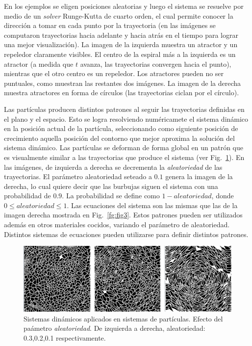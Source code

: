 \documentclass[oneside,a4paper,spanish,links]{amca}
\begin{document}
En los ejemplos se eligen posiciones aleatorias y luego el sistema se resuelve por medio de un {\em solver} Runge-Kutta de cuarto orden, el cual permite conocer la direcci\'on a tomar en cada punto por la trayectoria (en las im\'agenes se computaron trayectorias hacia adelante y hacia atrás en el tiempo para lograr una mejor visualizaci\'on). La imagen de la izquierda muestra un atractor y un repeledor claramente visibles. El centro de la espiral m\'as a la izquierda es un atractor (a medida que $t$ avanza, las trayectorias convergen hacia el punto), mientras que el otro centro es un repeledor. Los atractores pueden no ser puntuales, como muestran las restantes dos im\'agenes. La imagen de la derecha muestra atractores en forma de c\'irculos (las trayectorias ciclan por el c\'irculo).

Las part\'iculas producen distintos patrones al seguir las trayectorias definidas en el plano y el espacio. Esto se logra resolviendo num\'ericamete el sistema din\'amico en la posici\'on actual de la part\'icula, seleccionando como siguiente posici\'on de crecimiento aquella posici\'on del contorno que mejor aproxima la soluci\'on del sistema din\'amico. Las part\'iculas se deforman de forma global en un patr\'on que es visualmente similar a las trayectorias que produce el sistema (ver Fig.~\ref{fg:fig4}). En las im\'agenes, de izquierda a derecha se decrementa la {\em aleatoriedad} de las trayectorias. El par\'ametro aleatoriedad seteado a $0.1$ genera la imagen de la derecha, lo cual quiere decir que las burbujas siguen el sistema con una probabilidad de $0.9$. La probabilidad se define como $1-aleatoriedad$, donde $0 \leq aleatoriedad \leq 1$. Las ecuaciones del sistema son las mismas que las de la imagen derecha mostrada en Fig.~\ref{fg:fig3}. Estos patrones pueden ser utilizados adem\'as en otros materiales cocidos, variando el par\'ametro de aleatoriedad. Distintos sistemas de ecuaciones pueden utilizarse para definir distintos patrones.

\begin{figure}[htb!]
  \centerline{\includegraphics[scale=0.21]{fig4}}
  \caption{Sistemas din\'amicos aplicados en sistemas de part\'iculas. Efecto del pa\'ametro {\em aleatoriedad}. De izquierda a derecha, aleatoriedad: 0.3,0.2,0.1 respectivamente. }
  \label{fg:fig4}
\end{figure}
\end{document}
